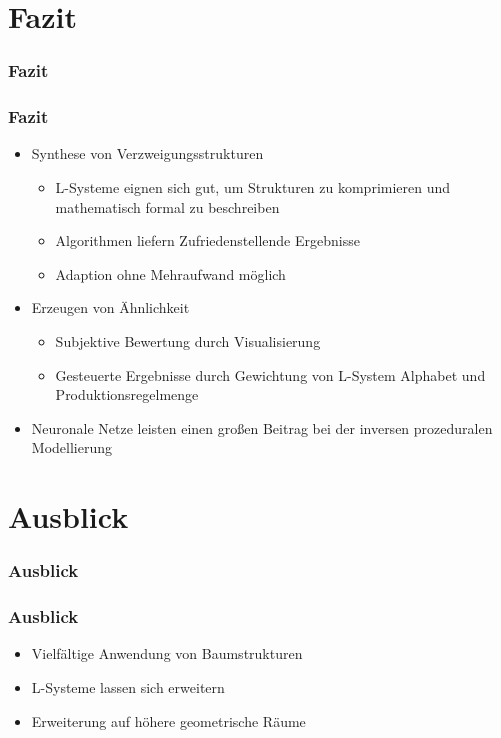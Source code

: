 \documentclass[12pt]{beamer}
\begin{document}
    \section{Fazit}
    \label{sec:fazit}
    \begin{frame}
        \frametitle{Fazit}
    \end{frame}

    \begin{frame}
        \frametitle{Fazit}

        \begin{itemize}
            \setlength\itemsep{1em}
            \item<1-> Synthese von Verzweigungsstrukturen
            \begin{itemize}
                \setlength\itemsep{1em}
                \item L-Systeme eignen sich gut, um Strukturen zu komprimieren und mathematisch formal zu beschreiben
                \item Algorithmen liefern Zufriedenstellende Ergebnisse
                \item Adaption ohne Mehraufwand möglich
            \end{itemize}
            \item<2-> Erzeugen von Ähnlichkeit
            \begin{itemize}
                \setlength\itemsep{1em}
                \item Subjektive Bewertung durch Visualisierung
                \item Gesteuerte Ergebnisse durch Gewichtung von L-System Alphabet und Produktionsregelmenge
            \end{itemize}
            \item<3-> Neuronale Netze leisten einen großen Beitrag bei der inversen prozeduralen Modellierung
        \end{itemize}
    \end{frame}

    \section{Ausblick}
    \label{sec:ausblick}
    \begin{frame}
        \frametitle{Ausblick}
    \end{frame}

    \begin{frame}
        \frametitle{Ausblick}

        \begin{itemize}
            \setlength\itemsep{1em}
            \item<1-> Vielfältige Anwendung von Baumstrukturen
            \item<2-> L-Systeme lassen sich erweitern
            \item<3-> Erweiterung auf höhere geometrische Räume
        \end{itemize}
    \end{frame}
\end{document}
